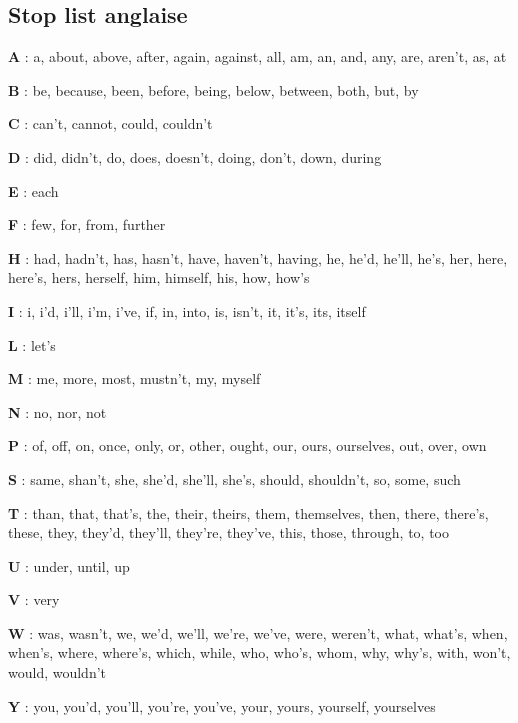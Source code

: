 \subsection{Stop list anglaise}

\textbf{A} : 
a, 
about, 
above, 
after, 
again, 
against, 
all, 
am, 
an, 
and, 
any, 
are, 
aren't, 
as, 
at

\textbf{B} : 
be, 
because, 
been, 
before, 
being, 
below, 
between, 
both, 
but, 
by

\textbf{C} : 
can't, 
cannot, 
could, 
couldn't

\textbf{D} : 
did, 
didn't, 
do, 
does, 
doesn't, 
doing, 
don't, 
down, 
during

\textbf{E} : 
each

\textbf{F} : 
few, 
for, 
from, 
further

\textbf{H} : 
had, 
hadn't, 
has, 
hasn't, 
have, 
haven't, 
having, 
he, 
he'd, 
he'll, 
he's, 
her, 
here, 
here's, 
hers, 
herself, 
him, 
himself, 
his, 
how, 
how's

\textbf{I} : 
i, 
i'd, 
i'll, 
i'm, 
i've, 
if, 
in, 
into, 
is, 
isn't, 
it, 
it's, 
its, 
itself

\textbf{L} : 
let's

\textbf{M} : 
me, 
more, 
most, 
mustn't, 
my, 
myself

\textbf{N} : 
no, 
nor, 
not

\textbf{P} : 
of, 
off, 
on, 
once, 
only, 
or, 
other, 
ought, 
our, 
ours, 
ourselves, 
out, 
over, 
own

\textbf{S} : 
same, 
shan't, 
she, 
she'd, 
she'll, 
she's, 
should, 
shouldn't, 
so, 
some, 
such

\textbf{T} : 
than, 
that, 
that's, 
the, 
their, 
theirs, 
them, 
themselves, 
then, 
there, 
there's, 
these, 
they, 
they'd, 
they'll, 
they're, 
they've, 
this, 
those, 
through, 
to, 
too

\textbf{U} : 
under, 
until, 
up

\textbf{V} : 
very

\textbf{W} : 
was, 
wasn't, 
we, 
we'd, 
we'll, 
we're, 
we've, 
were, 
weren't, 
what, 
what's, 
when, 
when's, 
where, 
where's, 
which, 
while, 
who, 
who's, 
whom, 
why, 
why's, 
with, 
won't, 
would, 
wouldn't

\textbf{Y} : 
you, 
you'd, 
you'll, 
you're, 
you've, 
your, 
yours, 
yourself, 
yourselves